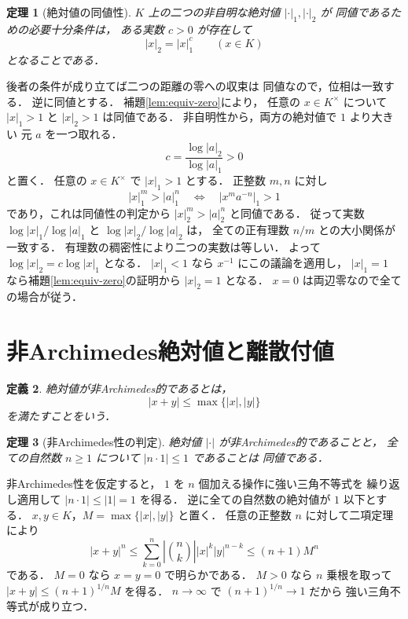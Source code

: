 \documentclass[a5paper,10pt,onecolumn]{jsarticle}
\makeatletter
\theoremstyle{mathnotetheorem}
\newtheorem{theorem}{定理}[section]
\newtheorem{definition}[theorem]{定義}
\renewcommand{\proofname}{証明}
\renewenvironment{proof}[1][\proofname]{%
  \par\pushQED{\qed}\normalfont\topsep4\p@\@plus2\p@\relax
  \trivlist\item[\hskip\labelsep\bfseries #1]\ignorespaces
}{\popQED\endtrivlist\@endpefalse}
\makeatother
\begin{document}
\begin{theorem}[絶対値の同値性]\label{thm:equiv-power}
$K$ 上の二つの非自明な絶対値 $|\cdot|_1,|\cdot|_2$ が
同値であるための必要十分条件は，
ある実数 $c>0$ が存在して
\[
 |x|_2=|x|_1^c\qquad(x\in K)
\]
となることである．
\end{theorem}
\begin{proof}
後者の条件が成り立てば二つの距離の零への収束は
同値なので，位相は一致する．
逆に同値とする．
補題\ref{lem:equiv-zero}により，
任意の $x\in K^\times$ について
$|x|_1>1$ と $|x|_2>1$ は同値である．
非自明性から，両方の絶対値で $1$ より大きい
元 $a$ を一つ取れる．
\[
 c=\frac{\log|a|_2}{\log|a|_1}>0
\]
と置く．
任意の $x\in K^\times$ で $|x|_1>1$ とする．
正整数 $m,n$ に対し
\[
 |x|_1^m>|a|_1^n
 \quad\Longleftrightarrow\quad
 |x^m a^{-n}|_1>1
\]
であり，これは同値性の判定から
$|x|_2^m>|a|_2^n$ と同値である．
従って実数
$\log|x|_1/\log|a|_1$ と
$\log|x|_2/\log|a|_2$ は，
全ての正有理数 $n/m$ との大小関係が一致する．
有理数の稠密性により二つの実数は等しい．
よって $\log|x|_2=c\log|x|_1$ となる．
$|x|_1<1$ なら $x^{-1}$ にこの議論を適用し，
$|x|_1=1$ なら補題\ref{lem:equiv-zero}の証明から
$|x|_2=1$ となる．
$x=0$ は両辺零なので全ての場合が従う．
\end{proof}

\section{非Archimedes絶対値と離散付値}

\begin{definition}
絶対値が\emph{非Archimedes的}であるとは，
\[
 |x+y|\le\max\{|x|,|y|\}
\]
を満たすことをいう．
\end{definition}

\begin{theorem}[非Archimedes性の判定]\label{thm:nonarch}
絶対値 $|\cdot|$ が非Archimedes的であることと，
全ての自然数 $n\ge1$ について $|n\cdot1|\le1$ であることは
同値である．
\end{theorem}
\begin{proof}
非Archimedes性を仮定すると，
$1$ を $n$ 個加える操作に強い三角不等式を
繰り返し適用して $|n\cdot1|\le|1|=1$ を得る．
逆に全ての自然数の絶対値が $1$ 以下とする．
$x,y\in K$，$M=\max\{|x|,|y|\}$ と置く．
任意の正整数 $n$ に対して二項定理により
\[
 |x+y|^n
 \le\sum_{k=0}^n
 \left|\binom nk\right||x|^k|y|^{n-k}
 \le(n+1)M^n
\]
である．
$M=0$ なら $x=y=0$ で明らかである．
$M>0$ なら $n$ 乗根を取って
$|x+y|\le(n+1)^{1/n}M$ を得る．
$n\to\infty$ で $(n+1)^{1/n}\to1$ だから
強い三角不等式が成り立つ．
\end{proof}
\end{document}
